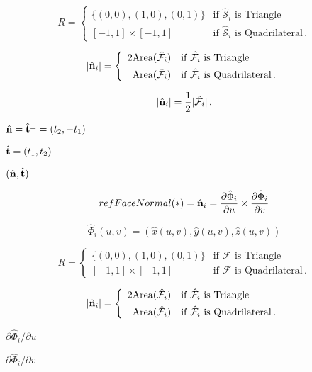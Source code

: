 \documentclass{article}
\begin{document}
\[
        R = \left\{\begin{array}{rl} 
        \{(0,0),(1,0),(0,1)\}   & \mbox{if $\hat{\mathcal S}_i$ is Triangle} \\[1ex]
            [-1,1]\times [-1,1] & \mbox{if $\hat{\mathcal S}_i$ is Quadrilateral} \,.
        \end{array}\right.
\]
\pagebreak

\[
        |\hat{\bf n}_i | = \left\{\begin{array}{rl} 
            2 \mbox{Area}(\hat{\mathcal F}_i) & \mbox{if $\hat{\mathcal F}_i$  is Triangle} \\[1ex]
              \mbox{Area}(\hat{\mathcal F}_i) & \mbox{if $\hat{\mathcal F}_i$ is Quadrilateral} \,.
        \end{array}\right.
\]
\pagebreak

\[
        |\hat{\bf n}_i | = {1\over 2} |\hat{\mathcal F}_i |\,.
\]
\pagebreak

$\hat{{\bf n}}= \hat{\bf t}^\perp = (t_2,-t_1)$
\pagebreak

$\hat{{\bf t}}=(t_1,t_2)$
\pagebreak

$(\hat{{\bf n}},\hat{{\bf t}})$
\pagebreak

\[
        {refFaceNormal}(*) = \hat{\bf n}_i = {\partial\hat{\Phi}_{i}\over\partial u} \times 
                             {\partial\hat{\Phi}_{i}\over\partial v}
\]
\pagebreak

\[
        \hat{\Phi}_i(u,v) =(\hat{x}(u,v),\hat{y}(u,v),\hat{z}(u,v))
\]
\pagebreak

\[
        R = \left\{\begin{array}{rl} 
            \{(0,0),(1,0),(0,1)\} & \mbox{if ${\mathcal F}$  is Triangle} \\[1ex]
              [-1,1]\times [-1,1] & \mbox{if ${\mathcal F}$ is Quadrilateral} \,.
            \end{array}\right.
\]
\pagebreak

\[
        |\hat{\bf n}_i | = \left\{\begin{array}{rl} 
            2 \mbox{Area}(\hat{\mathcal F}_i) & \mbox{if $\hat{\mathcal F}_i$  is Triangle} \\[1ex]
              \mbox{Area}(\hat{\mathcal F}_i) & \mbox{if $\hat{\mathcal F}_i$ is Quadrilateral} \,.
            \end{array}\right.
\]
\pagebreak

${\partial\hat{\Phi}_{i}/\partial u}$
\pagebreak

${\partial\hat{\Phi}_{i}/\partial v}$
\pagebreak
\end{document}
